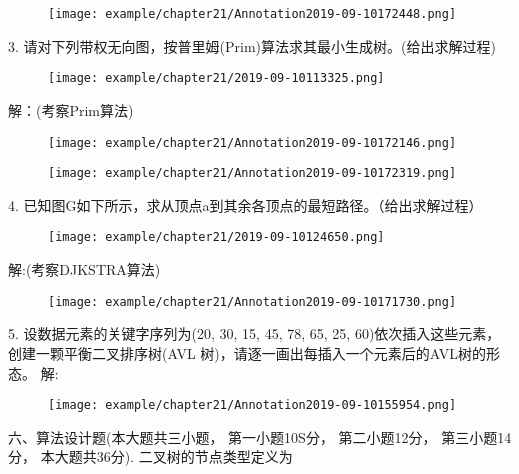 \begin{figure}[H]
	\centering  %
	\texttt{[image: example/chapter21/Annotation2019-09-10172448.png]}
\end{figure} 

3. 请对下列带权无向图，按普里姆(Prim)算法求其最小生成树。(给出求解过程)\newline
\begin{figure}[H]
	\centering  %
	\texttt{[image: example/chapter21/2019-09-10113325.png]}
\end{figure} 
解：(考察Prim算法)\newline
\begin{figure}[H]
	\centering  %
	\texttt{[image: example/chapter21/Annotation2019-09-10172146.png]}
\end{figure} 
\begin{figure}[H]
	\centering  %
	\texttt{[image: example/chapter21/Annotation2019-09-10172319.png]}
\end{figure}

4. 已知图G如下所示，求从顶点a到其余各顶点的最短路径。（给出求解过程）\newline
\begin{figure}[H]
	\centering  %
	\texttt{[image: example/chapter21/2019-09-10124650.png]}
\end{figure} 
解:(考察DJKSTRA算法)\newline
\begin{figure}[H]
	\centering  %
	\texttt{[image: example/chapter21/Annotation2019-09-10171730.png]}
\end{figure} 

5. 设数据元素的关键字序列为(20, 30, 15, 45, 78, 65, 25, 60)依次插入这些元素，创建一颗平衡二叉排序树(AVL 树)，请逐一画出每插入一个元素后的AVL树的形态。\newline
解:\newline
\begin{figure}[H]
	\centering  %
	\texttt{[image: example/chapter21/Annotation2019-09-10155954.png]}
\end{figure} 	

六、算法设计题(本大题共三小题， 第一小题10S分， 第二小题12分， 第三小题14分， 本大题共36分). 二叉树的节点类型定义为\newline


